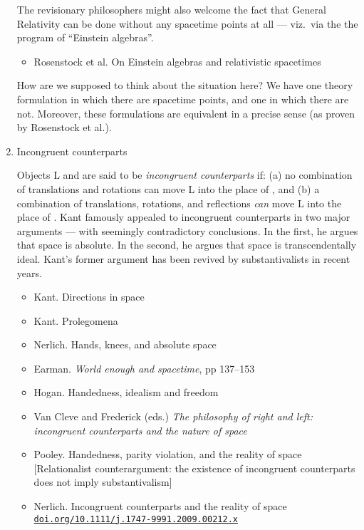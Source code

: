 \documentclass[11pt]{article}
\newcommand\rurl[1]{%
  \href{http://#1}{\nolinkurl{#1}}%
}
\begin{document}
\begin{enumerate}
  The revisionary philosophers might also welcome the fact that
  General Relativity can be done without any spacetime points at all
  --- viz.\ via the the program of ``Einstein algebras''.

  \begin{itemize}
  \item Rosenstock et al. On Einstein algebras and relativistic
    spacetimes 
  \end{itemize}

  How are we supposed to think about the situation here? We have one
  theory formulation in which there are spacetime points, and one in
  which there are not. Moreover, these formulations are equivalent in
  a precise sense (as proven by Rosenstock et al.).

\item Incongruent counterparts

  Objects L and  are said to be \emph{incongruent
    counterparts} if: (a) no combination of translations and rotations
  can move L into the place of , and (b) a combination
  of translations, rotations, and reflections \emph{can} move L into
  the place of . Kant famously appealed to incongruent
  counterparts in two major arguments --- with seemingly contradictory
  conclusions. In the first, he argues that space is absolute. In the
  second, he argues that space is transcendentally ideal. Kant's
  former argument has been revived by substantivalists in recent
  years.

  \begin{itemize}
  \item Kant. Directions in space
  \item Kant. Prolegomena
  \item Nerlich. Hands, knees, and absolute space
  \item Earman. \emph{World enough and spacetime}, pp 137--153
  \item Hogan. Handedness, idealism and freedom
  \item Van Cleve and Frederick (eds.) \textit{The philosophy of right
      and left: incongruent counterparts and the nature of space}
  \item Pooley. Handedness, parity violation, and the reality of space
    [Relationalist counterargument: the existence of incongruent
    counterparts does not imply substantivalism]
  \item Nerlich. Incongruent counterparts and the reality of space
    \rurl{doi.org/10.1111/j.1747-9991.2009.00212.x}
  \end{itemize}


\end{enumerate}
\end{document}
